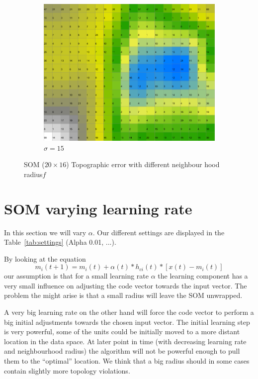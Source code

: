 \documentclass{acm_proc_article-sp}
\begin{document}
\begin{figure}
\begin{subfigure}[b]{0.30\linewidth}
        \includegraphics[width=\linewidth]{img/wine-newmid-activity-histogram-sigma-15}
        \caption{$\sigma=15$}
    \end{subfigure}
    \caption{SOM ($20\times16$) Topographic error with different neighbour hood radius$f$}
    \label{fig:wine-newmid-activity-histogram-sigma}
\end{figure}

\section{SOM varying learning rate}

In this section we will vary $\alpha$.  Our different settings are displayed in the Table~\ref{tab:settings} (Alpha 0.01, ...).

By looking at the equation
\[
    m_i(t+1) = m_i(t) + \alpha(t) * h_{ci}(t) * [x(t) - m_i(t)]
\]
our assumption is that for a small learning rate $\alpha$ the learning component has a very small
influence on adjusting the code vector towards the input vector.
The problem the might arise is that a small radius will leave the SOM unwrapped.

A very big learning rate on the other hand will force the code vector to perform a big initial adjustments towards the chosen input vector.
The initial learning step is very powerful, some of the units could be initially moved to
a more distant location in the data space. At later point in time (with decreasing learning rate and neighbourhood radius) the algorithm
will not be powerful enough to pull them to the ``optimal'' location. We think that a big radius should in some cases contain slightly more topology violations.
\end{document}
